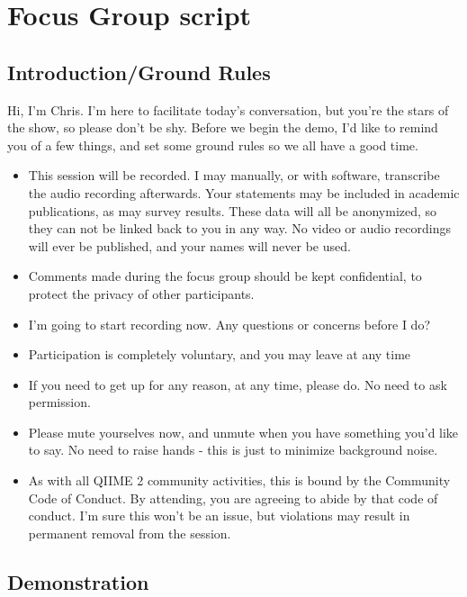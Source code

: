 \chapter{Focus Group script}
\label{app:FGScript}

\section*{Introduction/Ground Rules}

Hi, I’m Chris. I’m here to facilitate today’s conversation, but you’re the stars
of the show, so please don’t be shy.  Before we begin the demo, I’d like to
remind you of a few things, and set some ground rules so we all have a good
time.

\begin{itemize}
    \item This session will be recorded. I may manually, or with software, transcribe the audio recording afterwards. Your statements may be included in academic publications, as may survey results. These data will all be anonymized, so they can not be linked back to you in any way. No video or audio recordings will ever be published, and your names will never be used.
    \item Comments made during the focus group should be kept confidential, to protect the privacy of other participants.
    \item I’m going to start recording now. Any questions or concerns before I do?
    \item Participation is completely voluntary, and you may leave at any time
    \item If you need to get up for any reason, at any time, please do. No need to ask permission.
    \item Please mute yourselves now, and unmute when you have something you’d like to say. No need to raise hands - this is just to minimize background noise.
    \item As with all QIIME 2 community activities, this is bound by the Community Code of Conduct. By attending, you are agreeing to abide by that code of conduct. I’m sure this won’t be an issue, but violations may result in permanent removal from the session.
\end{itemize}


\section*{Demonstration}

